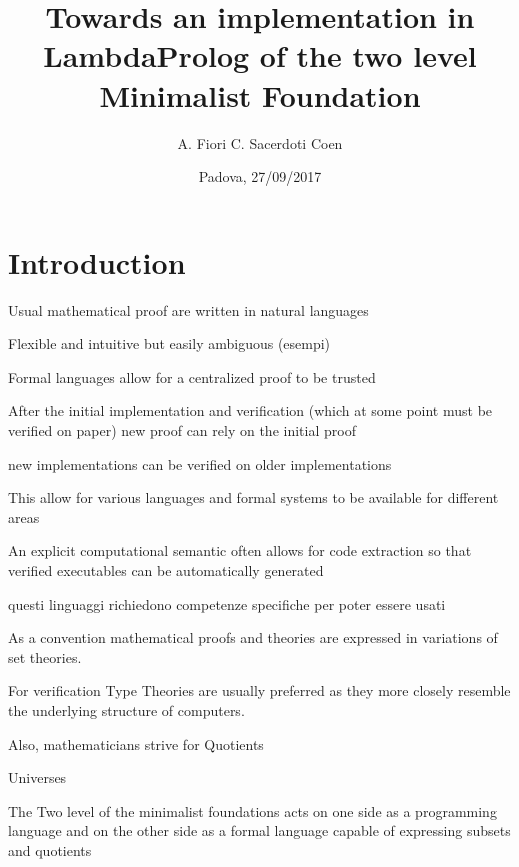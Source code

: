 \documentclass{beamer}
\title{Towards an implementation in LambdaProlog of the two level Minimalist Foundation}
\author{\hspace{1.7cm} A. Fiori \quad \quad C. Sacerdoti Coen}
\institute[University of Bologna]
{
  University of Padova \quad \quad
  University of Bologna
}
\date {Padova, 27/09/2017}
\begin{document}
\begin{frame}
  \titlepage
\end{frame}

\begin{frame}[fragile]
 \tableofcontents
\end{frame}


\section{Introduction}

	
\begin{frame}
	Usual mathematical proof are written in natural languages
	
	Flexible and intuitive but easily ambiguous
	(esempi)
	
	Formal languages allow for a centralized proof to be trusted
	
	After the initial implementation and verification (which at some point must be verified on paper) new proof can rely on the initial proof
	
	new implementations can be verified on older implementations
	
	This allow for various languages and formal systems to be available for different areas
	
	An explicit computational semantic often allows for code extraction so that verified executables can be automatically generated
	
	questi linguaggi richiedono competenze specifiche per poter essere usati
	
	As a convention mathematical proofs and theories are expressed in variations of set theories.
	
	For verification Type Theories are usually preferred as they more closely resemble the underlying structure of computers.
	
	Also, mathematicians strive for %
		Quotients
	
	Universes
	
	The Two level of the minimalist foundations acts on one side as a programming language and on the other side as a formal language capable of expressing subsets and quotients
	
\end{frame}
\end{document}
